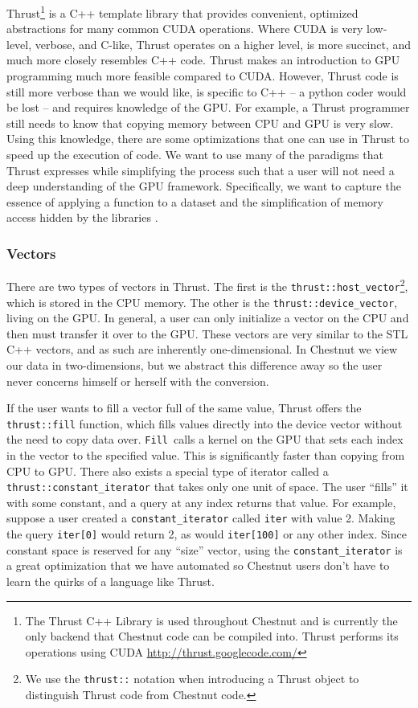 \documentclass[twocolumn]{article}
\renewcommand{\|}{\origbar} %
\newcommand{\code}[1]{\texttt{#1}}
\begin{document}
Thrust\footnote{The Thrust C++ Library is used throughout Chestnut and is currently the only backend that Chestnut code can be compiled into. Thrust performs its operations using CUDA \url{http://thrust.googlecode.com/}} is a C++ template library that provides convenient, optimized abstractions for many common CUDA operations. Where CUDA is very low-level, verbose, and C-like, Thrust operates on a higher level, is more succinct, and much more closely resembles C++ code. Thrust makes an introduction to GPU programming much more feasible compared to CUDA. However, Thrust code is still more verbose than we would like, is specific to C++ -- a python coder would be lost -- and requires knowledge of the GPU. For example, a Thrust programmer still needs to know that copying memory between CPU and GPU is very slow. Using this knowledge, there are some optimizations that one can use in Thrust to speed up the execution of code. We want to use many of the paradigms that Thrust expresses while simplifying the process such that a user will not need a deep understanding of the GPU framework. Specifically, we want to capture the essence of applying a function to a dataset and the simplification of memory access hidden by the libraries \cite{hoberock}.

\subsubsection{Vectors}
\label{sec:thrustVectors}

There are two types of vectors in Thrust. The first is the \code{thrust::host\_vector}\footnote{We use the \code{thrust::} notation when introducing a Thrust object to distinguish Thrust code from Chestnut code.}, which is stored in the CPU memory. The other is the \code{thrust::device\_vector}, living on the GPU. In general, a user can only initialize a vector on the CPU and then must transfer it over to the GPU. These vectors are very similar to the STL C++ vectors, and as such are inherently one-dimensional. In Chestnut we view our data in two-dimensions, but we abstract this difference away so the user never concerns himself or herself with the conversion. 

If the user wants to fill a vector full of the same value, Thrust offers the \code{thrust::fill} function, which fills values directly into the device vector without the need to copy data over. \code{Fill}~calls a kernel on the GPU that sets each index in the vector to the specified value. This is significantly faster than copying from CPU to GPU. There also exists a special type of iterator called a \code{thrust::constant\_iterator} that takes only one unit of space. The user ``fills'' it with some constant, and a query at any index returns that value. For example, suppose a user created a \code{constant\_iterator} called \code{iter} with value 2. Making the query \code{iter[0]} would return 2, as would \code{iter[100]} or any other index. Since constant space is reserved for any ``size'' vector, using  the \code{constant\_iterator} is a great optimization that we have automated so Chestnut users don't have to learn the quirks of a language like Thrust. 
\end{document}

